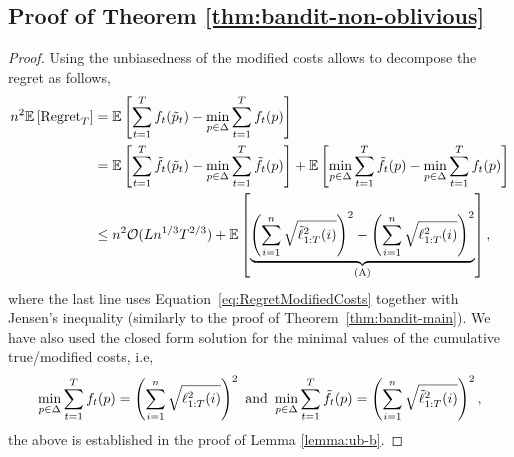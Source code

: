 \subsection{Proof of Theorem \ref{thm:bandit-non-oblivious} }
 \begin{proof}
 Using the unbiasedness of the modified costs allows to decompose the regret as follows,
\begin{align} \label{eq:Main} 
n^2\expval{ \regret_T } 
&=  
\expval{   \sumtt f_t(\tp_t)  - \min_{p \in \Delta }  \sumtt f_t(p)}  \nonumber\\
&=
\expval{   \sumtt \tf_t(\tp_t)  - \min_{p \in \Delta }  \sumtt \tf_t(p)}
+\expval{  \min_{p \in \Delta }  \sumtt \tf_t(p)  - \min_{p \in \Delta }  \sumtt f_t(p)}  \nonumber\\
&\leq
n^2\mathcal{O}(Ln^{1/3}T^{2/3}) 
+ 
\expval{  
\underset{\rA}{ \underbrace{
 \left(\sumin \sqrt{\tell_{1:T}^2(i)}  \right)^2 -  \left(\sumin \sqrt{\ell_{1:T}^2(i)}  \right)^2
 }}
 },
\end{align}
where  the last line uses  Equation~\eqref{eq:RegretModifiedCosts}  together with  Jensen's inequality (similarly to the proof of Theorem~\ref{thm:bandit-main}). We have also used the closed form solution for the minimal values of the cumulative true/modified costs, i.e, 
\begin{align*}
\min_{p\in\Delta}\sum_{t=1}^T f_t(p) = \left(\sum_{i=1}^n \sqrt{\ell_{1:T}^2(i)}  \right)^2 \textup{   and   }
 \min_{p\in\Delta}\sum_{t=1}^T \tilde{f}_t(p) = \left(\sum_{i=1}^n \sqrt{\tilde{\ell}_{1:T}^2(i)}  \right)^2,
\end{align*}
the above is established in the proof of Lemma \ref{lemma:ub-b}.
 
 
 

\end{proof}
